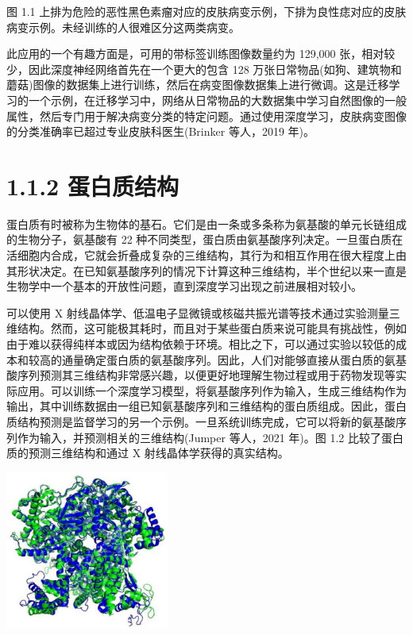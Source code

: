 \documentclass[10pt]{article}
\begin{document}
图 1.1 上排为危险的恶性黑色素瘤对应的皮肤病变示例，下排为良性痣对应的皮肤病变示例。未经训练的人很难区分这两类病变。

此应用的一个有趣方面是，可用的带标签训练图像数量约为 129,000 张，相对较少，因此深度神经网络首先在一个更大的包含 128 万张日常物品(如狗、建筑物和蘑菇)图像的数据集上进行训练，然后在病变图像数据集上进行微调。这是迁移学习的一个示例，在迁移学习中，网络从日常物品的大数据集中学习自然图像的一般属性，然后专门用于解决病变分类的特定问题。通过使用深度学习，皮肤病变图像的分类准确率已超过专业皮肤科医生(Brinker 等人，2019 年)。

\section*{1.1.2 蛋白质结构}

蛋白质有时被称为生物体的基石。它们是由一条或多条称为氨基酸的单元长链组成的生物分子，氨基酸有 22 种不同类型，蛋白质由氨基酸序列决定。一旦蛋白质在活细胞内合成，它就会折叠成复杂的三维结构，其行为和相互作用在很大程度上由其形状决定。在已知氨基酸序列的情况下计算这种三维结构，半个世纪以来一直是生物学中一个基本的开放性问题，直到深度学习出现之前进展相对较小。

可以使用 X 射线晶体学、低温电子显微镜或核磁共振光谱等技术通过实验测量三维结构。然而，这可能极其耗时，而且对于某些蛋白质来说可能具有挑战性，例如由于难以获得纯样本或因为结构依赖于环境。相比之下，可以通过实验以较低的成本和较高的通量确定蛋白质的氨基酸序列。因此，人们对能够直接从蛋白质的氨基酸序列预测其三维结构非常感兴趣，以便更好地理解生物过程或用于药物发现等实际应用。可以训练一个深度学习模型，将氨基酸序列作为输入，生成三维结构作为输出，其中训练数据由一组已知氨基酸序列和三维结构的蛋白质组成。因此，蛋白质结构预测是监督学习的另一个示例。一旦系统训练完成，它可以将新的氨基酸序列作为输入，并预测相关的三维结构(Jumper 等人，2021 年)。图 1.2 比较了蛋白质的预测三维结构和通过 \(\mathrm{X}\) 射线晶体学获得的真实结构。

\begin{center}
\includegraphics[max width=0.4\textwidth]{images/0194e279-9b28-703a-88f4-c3ac21e2010d_23_983_356_566_553_0.jpg}
\end{center}
\hspace*{3em} 
\end{document}
